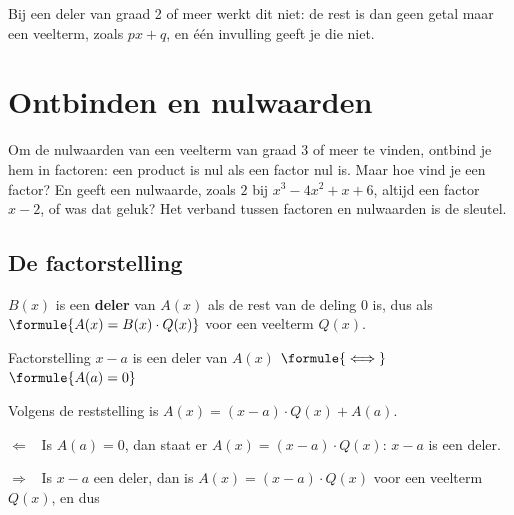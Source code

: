 
Bij een deler van graad 2 of meer werkt dit niet: de rest is dan geen getal maar een veelterm, zoals $px + q$, en één invulling geeft je die niet.

\begin{oefeningen}

\end{oefeningen}

\section{Ontbinden en nulwaarden}

Om de nulwaarden van een veelterm van graad 3 of meer te vinden, ontbind je hem in factoren: een product is nul als een factor nul is. Maar hoe vind je een factor? En geeft een nulwaarde, zoals $2$ bij $x^3 - 4x^2 + x + 6$, altijd een factor $x - 2$, of was dat geluk? Het verband tussen factoren en nulwaarden is de sleutel.

\subsection{De factorstelling}

\begin{theorie}
$B(x)$ is een \textbf{\textcolor{accent}{deler}} van $A(x)$ als de rest van de deling $0$ is, dus als $\formule{A(x) = B(x) \cdot Q(x)}$ voor een veelterm $Q(x)$.

\begin{stelling}{Factorstelling}
$x - a$ is een deler van $A(x)$ \quad $\formule{\iff}$ \quad $\formule{A(a) = 0}$
\end{stelling}

\begin{bewijs}
Volgens de reststelling is $A(x) = (x - a) \cdot Q(x) + A(a)$.

$\Leftarrow$ \ Is $A(a) = 0$, dan staat er $A(x) = (x - a) \cdot Q(x)$: $x - a$ is een deler.

$\Rightarrow$ \ Is $x - a$ een deler, dan is $A(x) = (x - a) \cdot Q(x)$ voor een veelterm $Q(x)$, en dus
\end{bewijs}
\end{theorie}

